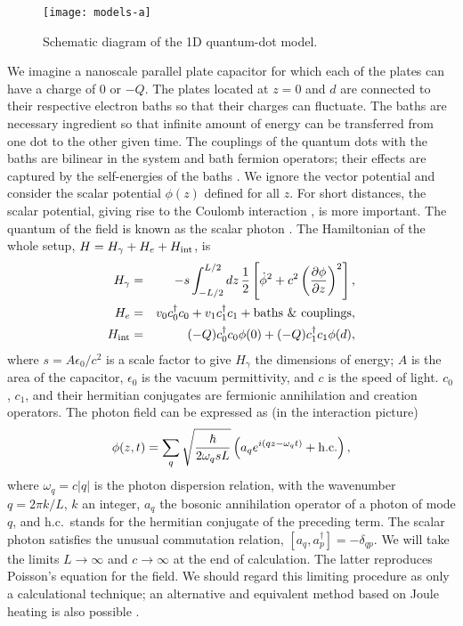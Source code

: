 \documentclass[doublecol]{epl2}
\begin{document}
\begin{figure}
\texttt{[image: models-a]}%
\caption{Schematic diagram of the 1D quantum-dot model.}
\end{figure}
We imagine a nanoscale parallel plate capacitor for which each of the plates can have a charge of 0 or 
$-Q$.
The plates located at $z=0$ and $d$ are connected to their respective electron baths so that their charges can fluctuate.  
The baths are necessary ingredient so that infinite amount of energy can be transferred from one dot to the other given
time.  The couplings of the quantum dots with the baths are bilinear in the system and bath fermion operators; 
their effects are captured by the self-energies of the baths \cite{wingreen-meir94}. 
We ignore the vector potential and consider
the scalar potential $\phi(z)$ defined for all $z$.   For short distances, the scalar potential, giving rise to the Coulomb
interaction \cite{Yu2016}, is more important.   The quantum of the field is known as the scalar photon \cite{Keller-book}.
The Hamiltonian of the whole setup, $H = H_{\gamma} + H_e + H_{{\rm int}}$, is 
\begin{eqnarray}
H_\gamma &=&- s \int_{-L/2}^{L/2} dz\, \frac{1}{2}\left[ \dot{\phi}^2 + c^2 \left({\partial \phi \over \partial z}\right)^2 \right], \\
H_e &=& v_0 c_0^\dagger c_0 + v_1 c_1^\dagger c_1 + {\rm baths\ \&\  couplings},\\
H_{{\rm int}} &=& (-Q) c_0^\dagger c_0 \phi(0) + (-Q) c_1^\dagger c_1 \phi(d),
\end{eqnarray}
where $s = A \epsilon_0/c^2$ is a scale factor to give $H_\gamma$ the dimensions of energy;  $A$ is the area of the capacitor, $\epsilon_0$ is the vacuum permittivity, and $c$ is the speed of light.  
$c_0$, $c_1$, and their hermitian conjugates are fermionic annihilation and creation operators.  The 
photon field can be expressed as (in the interaction picture) 
\begin{equation}
\label{eq-phi-qantum}
\phi(z,t) = \sum_{q} \sqrt{{\hbar \over 2 \omega_q s L}}\left( a_q 
e^{i(q z-\omega_q t)} + {\rm h.c.}\right),  
\end{equation}
where $\omega_q = c |q| $  is the photon dispersion 
relation, with the wavenumber $q = 2\pi k/L$, $k$ an integer,
$a_q$ the bosonic annihilation operator of a photon of mode $q$,
and h.c.~stands for the hermitian conjugate of the preceding term. 
The scalar photon satisfies the unusual commutation relation,
$[a_q, a_p^\dagger] = - \delta_{qp}$. 
We will take the limits $L \to \infty$ and $c \to \infty$ at the end of calculation. The latter 
reproduces Poisson's equation for the field.  We should regard this limiting procedure as only a 
calculational technique; an alternative and equivalent method based on Joule heating is also possible \cite{Yu2016}.
 
\end{document}
